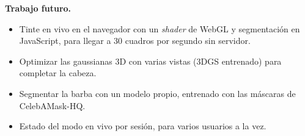 \textbf{Trabajo futuro.}
\begin{itemize}
  \item Tinte en vivo en el navegador con un \emph{shader} de WebGL y segmentación en JavaScript, para llegar a 30 cuadros por segundo sin servidor.
  \item Optimizar las gaussianas 3D con varias vistas (3DGS entrenado) para completar la cabeza.
  \item Segmentar la barba con un modelo propio, entrenado con las máscaras de CelebAMask-HQ.
  \item Estado del modo en vivo por sesión, para varios usuarios a la vez.
\end{itemize}
